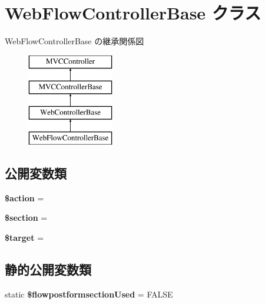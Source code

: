 \hypertarget{class_web_flow_controller_base}{}\section{Web\+Flow\+Controller\+Base クラス}
\label{class_web_flow_controller_base}
Web\+Flow\+Controller\+Base の継承関係図\begin{figure}[H]
\begin{center}
\leavevmode
\includegraphics[height=4.000000cm]{class_web_flow_controller_base}
\end{center}
\end{figure}
\subsection*{公開変数類}
\begin{DoxyCompactItemize}
\item 
\hypertarget{class_web_flow_controller_base_a7a24ae7bea03734fd2ca58d7a6a57a9d}{}{\bfseries \$action} =\textquotesingle{}\textquotesingle{}\label{class_web_flow_controller_base_a7a24ae7bea03734fd2ca58d7a6a57a9d}

\item 
\hypertarget{class_web_flow_controller_base_abfa9c5257034cc831f7049ffa31fb9d4}{}{\bfseries \$section} =\textquotesingle{}\textquotesingle{}\label{class_web_flow_controller_base_abfa9c5257034cc831f7049ffa31fb9d4}

\item 
\hypertarget{class_web_flow_controller_base_ac471f8b92614047d421b39d30792df28}{}{\bfseries \$target} =\textquotesingle{}\textquotesingle{}\label{class_web_flow_controller_base_ac471f8b92614047d421b39d30792df28}

\end{DoxyCompactItemize}
\subsection*{静的公開変数類}
\begin{DoxyCompactItemize}
\item 
\hypertarget{class_web_flow_controller_base_a5c29cc9ecd2e29c39f7412c71fe28820}{}static {\bfseries \$flowpostformsection\+Used} = F\+A\+L\+S\+E\label{class_web_flow_controller_base_a5c29cc9ecd2e29c39f7412c71fe28820}

\end{DoxyCompactItemize}
